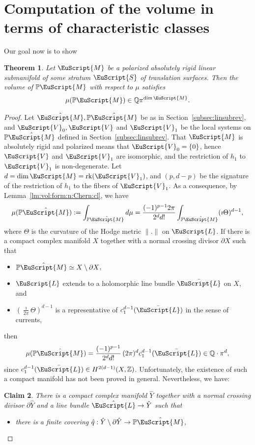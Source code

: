 \documentclass[JEP,XML,SOM,Unicode]{cedram}
\let\mathcal\EuScript
\theoremstyle{plain}
\newtheorem{Theorem}{Theorem}[section]
\newtheorem{Claim}[Theorem]{Claim}
\theoremstyle{definition}
\newcommand\Z{\mathbb{Z}}
\newcommand{\Q}{\mathbb{Q}}
\newcommand{\Pb}{\mathbb{P}}
\newcommand{\cL}{\mathcal{L}}
\newcommand{\cM}{\mathcal{M}}
\newcommand{\cS}{\mathcal{S}}
\newcommand{\cV}{\mathcal{V}}
\newcommand{\rk}{\mathrm{rk}}
\begin{document}
\section{Computation of the volume in terms of characteristic classes}\label{sec:rational:vol}
Our goal now is to show
\begin{Theorem}\label{th:vol:rational}
Let $\cM$ be a \emph{polarized absolutely rigid} linear submanifold of some stratum $\cS$ of translation surfaces.
Then the volume of $\Pb\cM$ with respect to $\mu$ satisfies
\[
\mu(\Pb\cM)\in \Q\pi^{\dim\cM}.
\]
\end{Theorem}
\begin{proof}
Let $\hat{\cM}, \Pb\hat{\cM}$ be as in Section~\ref{subsec:linsubrev}, and $\cV_0, \cV$ and $\cV_1$ be the local systems on $\Pb\hat\cM$ defined in Section~\ref{subsec:linsubrev}.
That $\cM$ is absolutely rigid and polarized means that $\cV_0=\{0\}$, hence $\cV$ and $\cV_1$ are isomorphic, and the restriction of $h_1$ to $\cV_1$ is non-degenerate. Let $d=\dim\cM=\rk(\cV_1)$, and $(p,d-p)$ be the signature of the restriction of $h_1$ to the fibers of $\cV_1$. As a consequence, by Lemma~\ref{lm:vol:form:n:Chern:cl}, we have
\[
\mu(\Pb\hat{\cM}):=\int_{\Pb\hat{\cM}}d\mu=\frac{(-1)^{p-1}2\pi}{2^dd!}\int_{\Pb\hat{\cM}}(\imath\Theta)^{d-1},
\]
where $\Theta$ is the curvature of the Hodge metric $\|.\|$ on $\cL$. If there is a compact complex manifold $X$ together with a normal crossing divisor $\partial X$ such that
\begin{itemize}
\item $\Pb\hat{\cM}\simeq X\setminus \partial X$,

\item $\cL$ extends to a holomorphic line bundle $\bar{\cL}$ on $X$, and

\item $(\frac{\imath}{2\pi}\Theta)^{d-1}$ is a representative of $c_1^{d-1}(\bar{\cL})$ in the sense of currents,
\end{itemize}
then
\[
\mu(\Pb\hat{\cM})=\frac{(-1)^{p-1}}{2^dd!}\,(2\pi)^{d}c_1^{d-1}(\bar{\cL}) \in \Q\cdot\pi^d,
\]
since $c_1^{d-1}(\bar{\cL}) \in H^{2(d-1)}(X,\Z)$.
Unfortunately, the existence of such a compact manifold has not been proved in general.
Nevertheless, we have:
\begin{Claim}\label{cl:vol:Chern:cls}
There is a compact complex manifold $\hat{Y}$ together with a normal crossing divisor $\partial \hat{Y}$ and a line bundle $\hat{\cL}\to \hat{Y}$ such that
\begin{itemize}
\item there is a finite covering $\hat{q}: \hat{Y}\setminus\partial \hat{Y} \to \Pb\hat{\cM}$,


\end{itemize}
\end{Claim}
\end{proof}
\end{document}
